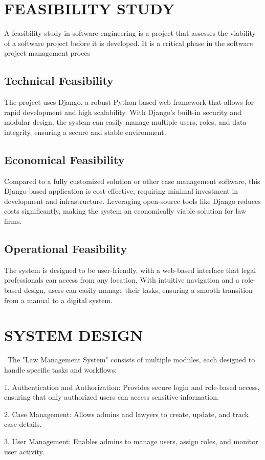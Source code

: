 \chapter{FEASIBILITY STUDY}

A feasibility study in software engineering is a project that assesses the viability of a software project before it is developed. It is a critical phase in the software project management proces
	
\section{Technical Feasibility}
The project uses Django, a robust Python-based web framework that allows for rapid development and high scalability. With Django’s built-in security and modular design, the system can easily manage multiple users, roles, and data integrity, ensuring a secure and stable environment.
\section{Economical Feasibility}
Compared to a fully customized solution or other case management software, this Django-based application is cost-effective, requiring minimal investment in development and infrastructure. Leveraging open-source tools like Django reduces costs significantly, making the system an economically viable solution for law firms.
\section{Operational Feasibility}
The system is designed to be user-friendly, with a web-based interface that legal professionals can access from any location. With intuitive navigation and a role-based design, users can easily manage their tasks, ensuring a smooth transition from a manual to a digital system.
\chapter{SYSTEM DESIGN}
\
The "Law Management System" consists of multiple modules, each designed to handle specific tasks and workflows:

1. Authentication and Authorization: Provides secure login and role-based access, ensuring that only authorized users can access sensitive information.

2. Case Management: Allows admins and lawyers to create, update, and track case details.

3. User Management: Enables admins to manage users, assign roles, and monitor user activity.

